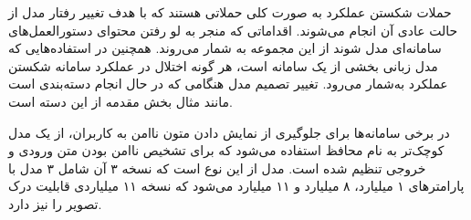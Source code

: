 
حملات شکستن عملکرد به صورت کلی حملاتی هستند که با هدف تغییر رفتار مدل از حالت عادی آن انجام می‌شوند. اقداماتی که منجر به لو رفتن محتوای دستورالعمل‌های سامانه‌ای مدل شوند از این مجموعه به شمار می‌روند. همچنین در استفاده‌هایی که مدل زبانی بخشی از یک سامانه است، هر گونه اختلال در عملکرد سامانه شکستن عملکرد به‌شمار می‌رود. تغییر تصمیم مدل هنگامی که در حال انجام دسته‌بندی است مانند مثال بخش مقدمه از این دسته است.


در برخی سامانه‌ها برای جلوگیری از نمایش دادن متون ناامن به کاربران، از یک مدل کوچک‌تر به نام محافظ استفاده می‌شود که برای تشخیص ناامن بودن متن ورودی و خروجی تنظیم شده است. مدل  از این نوع است که نسخه ۳ آن شامل ۳ مدل با پارامتر‌های ۱ میلیارد، ۸ میلیارد و ۱۱ میلیارد می‌شود که نسخه ۱۱ میلیاردی قابلیت درک تصویر را نیز دارد.